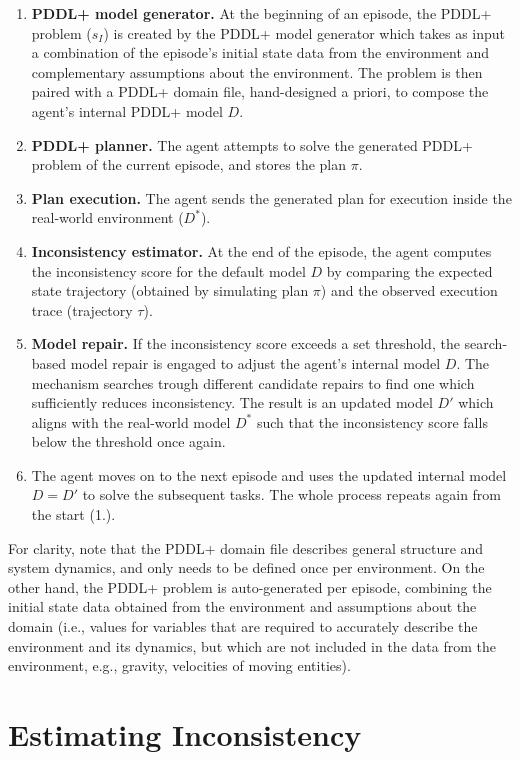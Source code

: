 \documentclass[letterpaper]{article} %
\begin{document}
\begin{enumerate}
    \item \textbf{PDDL+ model generator.} At the beginning of an episode, the PDDL+ problem ($s_I$) is created by the PDDL+ model generator which takes as input a combination of the episode's initial state data from the environment and complementary assumptions about the environment. The problem is then paired with a PDDL+ domain file, hand-designed a priori, to compose the agent's internal PDDL+ model $D$.
    \item \textbf{PDDL+ planner.} The agent attempts to solve the generated PDDL+ problem of the current episode, and stores the plan $\pi$.
    \item \textbf{Plan execution.} The agent sends the generated plan for execution inside the real-world environment ($D^*$).
    \item \textbf{Inconsistency estimator.} At the end of the episode, the agent computes the inconsistency score for the default model $D$ by comparing the expected state trajectory (obtained by simulating plan $\pi$) and the observed execution trace (trajectory $\tau$).
    \item \textbf{Model repair.} If the inconsistency score exceeds a set threshold, the search-based model repair is engaged to adjust the agent's internal model $D$. The mechanism searches trough different candidate repairs to find one which sufficiently reduces inconsistency. The result is an updated model $D'$ which aligns with the real-world model $D^*$ such that the inconsistency score falls below the threshold once again.
    \item The agent moves on to the next episode and uses the updated internal model $D=D'$ to solve the subsequent tasks. The whole process repeats again from the start (1.).
\end{enumerate}

For clarity, note that the PDDL+ domain file describes general structure and system dynamics, and only needs to be defined once per environment. On the other hand, the PDDL+ problem is auto-generated per episode, combining the initial state data obtained from the environment and assumptions about the domain (i.e., values for variables that are required to accurately describe the environment and its dynamics, but which are not included in the data from the environment, e.g., gravity, velocities of moving entities).


\section{Estimating Inconsistency}
\end{document}
